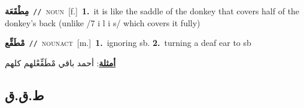 \documentclass[10pt,a4paper,twoside]{article} %
\begin{document}
\begin{multicols}{2}
{\setlength\topsep{0pt}\textbf{\foreignlanguage{arabic}{مِطْقَعَة}}\ {\color{gray}\texttt{//}\color{black}}\ \textsc{noun}\ [f.]\ \textbf{1.}~it is like the saddle of the donkey that covers half of the donkey's back (unlike /7 i l i s/ which covers it fully)\ } \vspace{2mm}

{\setlength\topsep{0pt}\textbf{\foreignlanguage{arabic}{مْطَقِّع}}\ {\color{gray}\texttt{//}\color{black}}\ \textsc{noun\textunderscore act}\ [m.]\ \textbf{1.}~ignoring sb.  \textbf{2.}~turning a deaf ear to sb\  \begin{flushright}\color{gray}\foreignlanguage{arabic}{\textbf{\underline{\foreignlanguage{arabic}{أمثلة}}}: أحمد باقي مْطَقِّعْلهم كلهم}\end{flushright}\color{black}} \vspace{2mm}

\vspace{-3mm}
\subsection*{\color{blue}\foreignlanguage{arabic}{ط.ق.ق}\color{blue}{}} 


\end{multicols}
\end{document}
